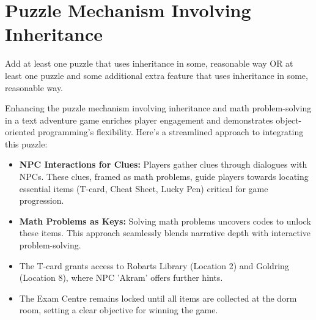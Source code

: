 \documentclass[11pt]{article}
\begin{document}
\pagebreak

\section*{Puzzle Mechanism Involving Inheritance}
Add at least one puzzle that uses inheritance in some, reasonable way OR at least one puzzle and some additional extra feature that uses inheritance in some, reasonable way.
\vspace{5mm}

Enhancing the puzzle mechanism involving inheritance and math problem-solving in a text adventure game enriches player engagement and demonstrates object-oriented programming's flexibility. Here's a streamlined approach to integrating this puzzle:

\begin{itemize}
    \item \textbf{NPC Interactions for Clues:} Players gather clues through dialogues with NPCs. These clues, framed as math problems, guide players towards locating essential items (T-card, Cheat Sheet, Lucky Pen) critical for game progression.
    \item \textbf{Math Problems as Keys:} Solving math problems uncovers codes to unlock these items. This approach seamlessly blends narrative depth with interactive problem-solving.
    \item The T-card grants access to Robarts Library (Location 2) and Goldring (Location 8), where NPC 'Akram' offers further hints.
    \item The Exam Centre remains locked until all items are collected at the dorm room, setting a clear objective for winning the game.
\end{itemize}
\end{document}
